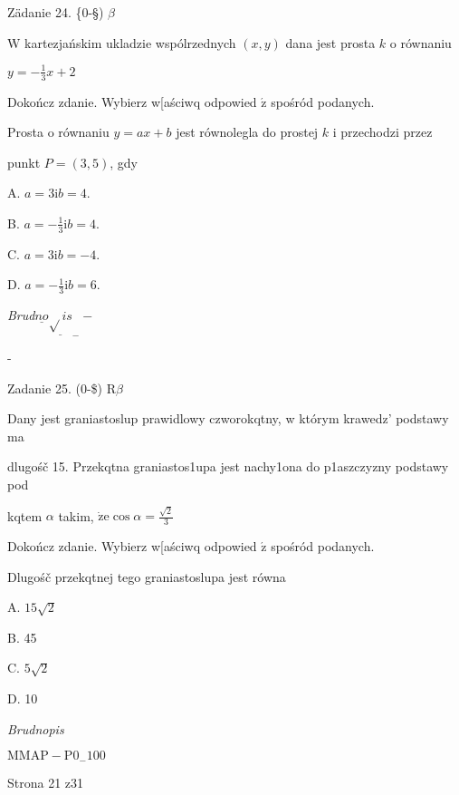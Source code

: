 \documentclass[a4paper,12pt]{article}
\begin{document}
Zädanie 24. \{0-\S) $\beta$

$\mathrm{W}$ kartezjańskim ukladzie wspólrzednych $(x,y)$ dana jest prosta $k$ o równaniu

$y=-\displaystyle \frac{1}{3}x+2$

Dokończ zdanie. Wybierz w[aściwq odpowied $\acute{\mathrm{z}}$ spośród podanych.

Prosta o równaniu $y=ax+b$ jest równolegla do prostej $k$ i przechodzi przez

punkt $P=(3,5)$, gdy

A. $a=3 \mathrm{i} b=4.$

B. $a=-\displaystyle \frac{1}{3} \mathrm{i} b=4.$

C. $a=3 \mathrm{i} b=-4.$

D. $a=-\displaystyle \frac{1}{3} \mathrm{i} b=6.$

{\it Brud}$\underline{no}\underline{\sqrt{}is}_{-} -$

-

Zadanie 25. (0-{\$}) $\mathrm{R} \beta$

Dany jest graniastoslup prawidlowy czworokqtny, w którym krawedz' podstawy ma

dlugośč 15. Przekqtna graniastos1upa jest nachy1ona do p1aszczyzny podstawy pod

kqtem $\alpha$ takim, $\dot{\mathrm{z}}\mathrm{e} \displaystyle \cos\alpha=\frac{\sqrt{2}}{3}$

Dokończ zdanie. Wybierz w[aściwq odpowied $\acute{\mathrm{z}}$ spośród podanych.

Dlugośč przekqtnej tego graniastoslupa jest równa

A. $15\sqrt{2}$

B. 45

C. $5\sqrt{2}$

D. 10

{\it Brudnopis}

$\mathrm{M}\mathrm{M}\mathrm{A}\mathrm{P}-\mathrm{P}0_{-}100$

Strona 21 z31
\end{document}
